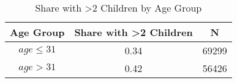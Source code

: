 \begin{table}

\caption{\label{tab:tab:children_age_group}Share with \textgreater 2 Children by Age Group}
\centering
\begin{tabular}[t]{ccc}
\toprule
Age Group & Share with \textgreater 2 Children & N\\
\midrule
$age \leq 31$ & 0.34 & 69299\\
$age > 31$ & 0.42 & 56426\\
\bottomrule
\end{tabular}
\end{table}

